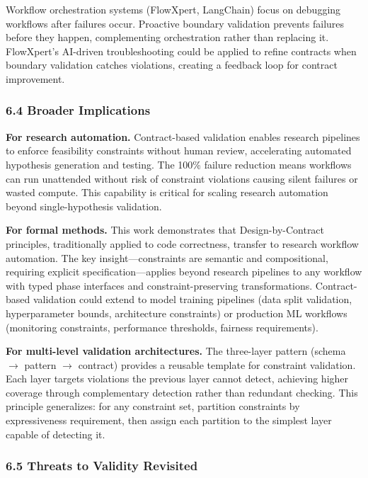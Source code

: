Workflow orchestration systems (FlowXpert, LangChain) focus on debugging workflows after failures occur. Proactive boundary validation prevents failures before they happen, complementing orchestration rather than replacing it. FlowXpert's AI-driven troubleshooting could be applied to refine contracts when boundary validation catches violations, creating a feedback loop for contract improvement.

\subsubsection{6.4 Broader Implications}

\textbf{For research automation.} Contract-based validation enables research pipelines to enforce feasibility constraints without human review, accelerating automated hypothesis generation and testing. The 100\% failure reduction means workflows can run unattended without risk of constraint violations causing silent failures or wasted compute. This capability is critical for scaling research automation beyond single-hypothesis validation.

\textbf{For formal methods.} This work demonstrates that Design-by-Contract principles, traditionally applied to code correctness, transfer to research workflow automation. The key insight---constraints are semantic and compositional, requiring explicit specification---applies beyond research pipelines to any workflow with typed phase interfaces and constraint-preserving transformations. Contract-based validation could extend to model training pipelines (data split validation, hyperparameter bounds, architecture constraints) or production ML workflows (monitoring constraints, performance thresholds, fairness requirements).

\textbf{For multi-level validation architectures.} The three-layer pattern (schema $\rightarrow$ pattern $\rightarrow$ contract) provides a reusable template for constraint validation. Each layer targets violations the previous layer cannot detect, achieving higher coverage through complementary detection rather than redundant checking. This principle generalizes: for any constraint set, partition constraints by expressiveness requirement, then assign each partition to the simplest layer capable of detecting it.

\subsubsection{6.5 Threats to Validity Revisited}

